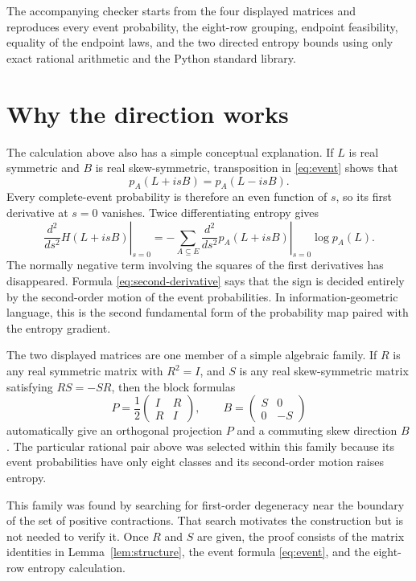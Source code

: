 \documentclass[11pt]{article}
\begin{document}
The accompanying checker starts from the four displayed matrices and
reproduces every event probability, the eight-row grouping,
endpoint feasibility, equality of the endpoint laws, and the two directed
entropy bounds using only exact rational arithmetic and the Python standard
library.

\section{Why the direction works}

The calculation above also has a simple conceptual explanation.  If $L$ is
real symmetric and $B$ is real skew-symmetric, transposition in
\eqref{eq:event} shows that
\[
 p_A(L+isB)=p_A(L-isB).
\]
Every complete-event probability is therefore an even function of $s$, so
its first derivative at $s=0$ vanishes.  Twice differentiating entropy gives
\begin{equation}\label{eq:second-derivative}
 \left.\frac{d^2}{ds^2}H(L+isB)\right|_{s=0}
 =-\sum_{A\subseteq E}
 \left.\frac{d^2}{ds^2}p_A(L+isB)\right|_{s=0}\log p_A(L).
\end{equation}
The normally negative term involving the squares of the first derivatives has
disappeared.  Formula \eqref{eq:second-derivative} says that the sign is decided
entirely by the second-order motion of the event probabilities.  In
information-geometric language, this is the second fundamental form of the
probability map paired with the entropy gradient.

The two displayed matrices are one member of a simple algebraic family.  If
$R$ is any real symmetric matrix with $R^2=I$, and $S$ is any real
skew-symmetric matrix satisfying $RS=-SR$, then the block formulas
\[
 P=\frac12\begin{pmatrix}I&R\\R&I\end{pmatrix},
 \qquad
 B=\begin{pmatrix}S&0\\0&-S\end{pmatrix}
\]
automatically give an orthogonal projection $P$ and a commuting skew direction
$B$.  The particular rational pair above was selected within this family
because its event probabilities have only eight classes and its second-order
motion raises entropy.

This family was found by searching for first-order degeneracy near the boundary
of the set of positive contractions.  That search motivates the construction
but is not needed to verify it.  Once $R$ and $S$ are given, the proof consists
of the matrix identities in Lemma~\ref{lem:structure}, the event formula
\eqref{eq:event}, and the eight-row entropy calculation.
\end{document}
